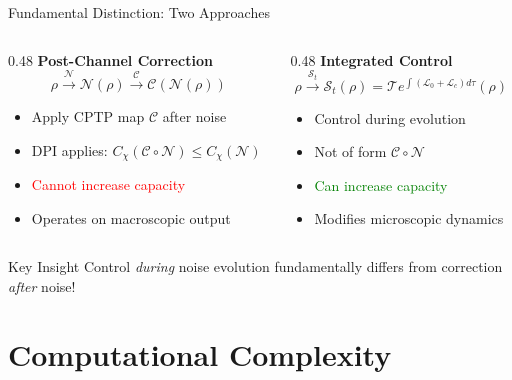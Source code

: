 \documentclass[aspectratio=169,12pt]{beamer}
\newcommand{\Lgen}{\mathcal{L}}
\newcommand{\SJ}{\mathcal{S}}
\newcommand{\T}{\mathcal{T}}
\begin{document}
\begin{frame}{Fundamental Distinction: Two Approaches}
\begin{columns}
\begin{column}{0.48\textwidth}
\textbf{Post-Channel Correction}
$$\rho \xrightarrow{\mathcal{N}} \mathcal{N}(\rho) \xrightarrow{\mathcal{C}} \mathcal{C}(\mathcal{N}(\rho))$$

\vspace{0.2cm}

\begin{itemize}
\item Apply CPTP map $\mathcal{C}$ after noise
\item DPI applies: $C_\chi(\mathcal{C} \circ \mathcal{N}) \leq C_\chi(\mathcal{N})$
\item \textcolor{red}{Cannot increase capacity}
\item Operates on macroscopic output
\end{itemize}
\end{column}

\begin{column}{0.48\textwidth}
\textbf{Integrated Control}
$$\rho \xrightarrow{\SJ_t} \SJ_t(\rho) = \T e^{\int (\Lgen_0 + \Lgen_c) d\tau}(\rho)$$

\vspace{0.2cm}

\begin{itemize}
\item Control during evolution
\item Not of form $\mathcal{C} \circ \mathcal{N}$
\item \textcolor{green}{Can increase capacity}
\item Modifies microscopic dynamics
\end{itemize}
\end{column}
\end{columns}

\vspace{0.5cm}

\begin{alertblock}{Key Insight}
Control \textit{during} noise evolution fundamentally differs from correction \textit{after} noise!
\end{alertblock}
\end{frame}

\section{Computational Complexity}
\end{document}
